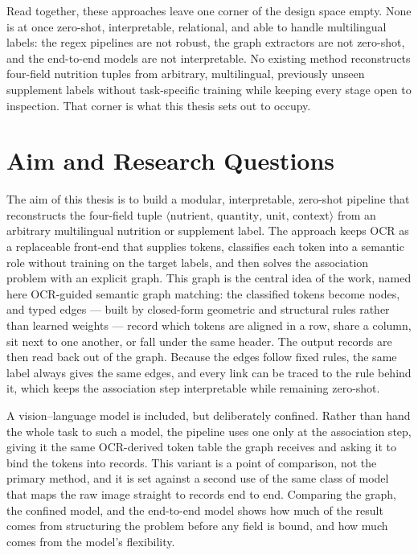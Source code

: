 Read together, these approaches leave one corner of the design space empty. None
is at once zero-shot, interpretable, relational, and able to handle multilingual
labels: the regex pipelines are not robust, the graph extractors are not
zero-shot, and the end-to-end models are not interpretable. No existing method
reconstructs four-field nutrition tuples from arbitrary, multilingual, previously
unseen supplement labels without task-specific training while keeping every stage
open to inspection. That corner is what this thesis sets out to occupy.

\section{Aim and Research Questions}\label{sec:intro-questions}

The aim of this thesis is to build a modular, interpretable, zero-shot pipeline
that reconstructs the four-field tuple
$\langle\text{nutrient},\,\text{quantity},\,\text{unit},\,\text{context}\rangle$
from an arbitrary multilingual nutrition or supplement label. The approach keeps
OCR as a replaceable front-end that supplies tokens, classifies each token into a
semantic role without training on the target labels, and then solves the
association problem with an explicit graph. This graph is the central idea of the
work, named here OCR-guided semantic graph matching: the classified tokens become
nodes, and typed edges --- built by closed-form geometric and structural rules
rather than learned weights --- record which tokens are aligned in a row, share a
column, sit next to one another, or fall under the same header. The output records
are then read back out of the graph. Because the edges follow fixed rules, the
same label always gives the same edges, and every link can be traced to the rule
behind it, which keeps the association step interpretable while remaining
zero-shot.

A vision--language model is included, but deliberately confined. Rather than hand
the whole task to such a model, the pipeline uses one only at the association
step, giving it the same OCR-derived token table the graph receives and asking it
to bind the tokens into records. This variant is a point of comparison, not the
primary method, and it is set against a second use of the same class of model that
maps the raw image straight to records end to end. Comparing the graph, the
confined model, and the end-to-end model shows how much of the result comes from
structuring the problem before any field is bound, and how much comes from the
model's flexibility.

